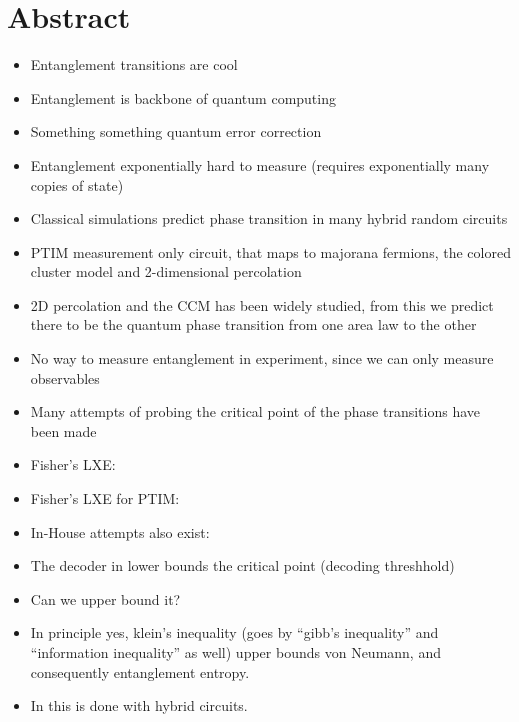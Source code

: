 \chapter{Abstract}
\label{ch:intro}

\begin{itemize}
  \item Entanglement transitions are cool
  \item Entanglement is backbone of quantum computing
  \item Something something quantum error correction
  \item Entanglement exponentially hard to measure (requires exponentially many
    copies of state)
  \item Classical simulations predict phase transition in many hybrid random
    circuits
  \item PTIM \cite{langEntanglementTransitionProjective2020} measurement only
    circuit, that maps to majorana fermions, the colored cluster model and
    2-dimensional percolation
  \item 2D percolation and the CCM has been widely studied, from this we
    predict there to be the quantum phase transition from one area law to the
    other
  \item No way to measure entanglement in experiment, since we can only measure
    observables
  \item Many attempts of probing the critical point of the phase transitions
    have been made
  \item Fisher's LXE: \cite{liCrossEntropyBenchmark2023}
  \item Fisher's LXE for PTIM:
    \cite{tikhanovskayaUniversalityCrossEntropy2023}
  \item In-House attempts also exist:
  \item The decoder in \cite{roserDecodingProjectiveTransverse2023} lower
    bounds the critical point (decoding threshhold)
  \item Can we upper bound it?
  \item In principle yes, klein's inequality (goes by \enquote{gibb's
    inequality} and \enquote{information inequality} as well) upper bounds
    von Neumann, and consequently entanglement entropy.
  \item In \cite{garrattProbingPostmeasurementEntanglement2023} this is done
    with hybrid circuits.
\end{itemize}

